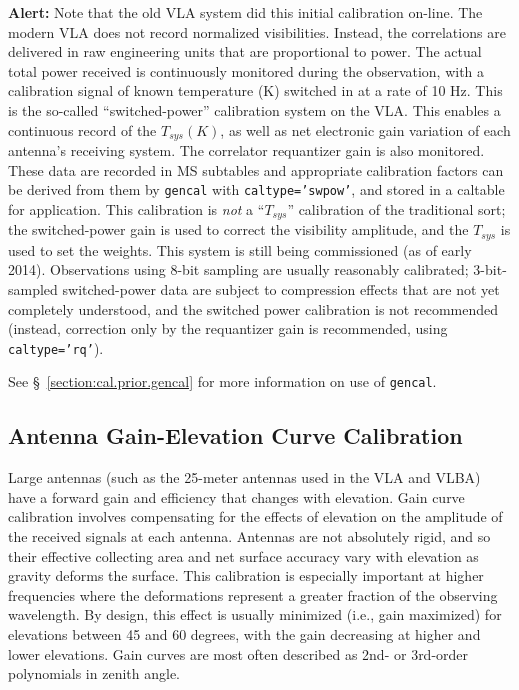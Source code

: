{\bf Alert:}  Note that the old VLA system did this initial calibration on-line.
The modern VLA does not record normalized visibilities.  Instead,
the correlations are delivered in raw engineering units that are 
proportional to power.  The actual total power received is 
continuously monitored during the observation, with a calibration
signal of known temperature (K) switched in at a rate of 10 Hz.
This is the so-called ``switched-power'' calibration system on 
the VLA. This enables a continuous record of the $T_{sys}(K)$, as well as 
net electronic gain variation of each antenna's receiving system.
The correlator requantizer gain is also monitored. 
These data are recorded in MS subtables and appropriate calibration
factors can be derived from them by {\tt gencal} with 
{\tt caltype='swpow'}, and stored in a caltable for application.
This calibration is {\em not} a ``$T_{sys}$'' calibration of the traditional
sort; the switched-power gain is used to correct the visibility
amplitude, and the $T_{sys}$ is used to set the weights. This system
is still being commissioned (as of early 2014). Observations using
8-bit sampling are usually reasonably calibrated; 3-bit-sampled
switched-power data are subject to compression effects that are
not yet completely understood, and the switched power calibration is
not recommended (instead, correction only by the requantizer
gain is recommended, using {\tt caltype='rq'}).

See \S~\ref{section:cal.prior.gencal} for more information on use
of {\tt gencal}.


\subsection{Antenna Gain-Elevation Curve Calibration}
\label{section:cal.prior.curves}

Large antennas (such as the 25-meter antennas used
in the VLA and VLBA) have a forward gain and efficiency that changes with
elevation. Gain curve calibration involves compensating for the effects of
elevation on the amplitude of the received signals at each antenna.
Antennas are not absolutely rigid, and so their effective collecting
area and net surface accuracy vary with elevation as gravity deforms
the surface.  This calibration is especially important at higher
frequencies where the deformations represent a greater fraction of the
observing wavelength.  By design, this effect is usually minimized
(i.e., gain maximized) for elevations between 45 and 60 degrees, with
the gain decreasing at higher and lower elevations.  Gain curves are
most often described as 2nd- or 3rd-order polynomials in zenith angle.

